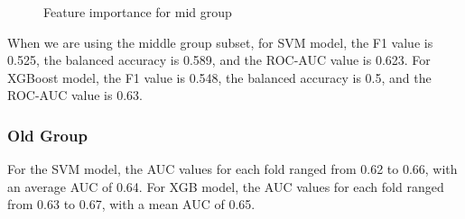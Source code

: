 \documentclass{article}
\begin{document}
\begin{figure}[!ht]
    \centering
    \qquad
    \caption{Feature importance for mid group}
\end{figure}

When we are using the middle group subset, for SVM model, the F1 value is 0.525, the balanced accuracy is 0.589, and the ROC-AUC value is 0.623. For XGBoost model, the F1 value is 0.548, the balanced accuracy is 0.5, and the ROC-AUC value is 0.63.

\subsubsection{Old Group}

For the SVM model, the AUC values for each fold ranged from 0.62 to 0.66, with an average AUC of 0.64. For XGB model, the AUC values for each fold ranged from 0.63 to 0.67, with a mean AUC of 0.65. \newpage
\end{document}
